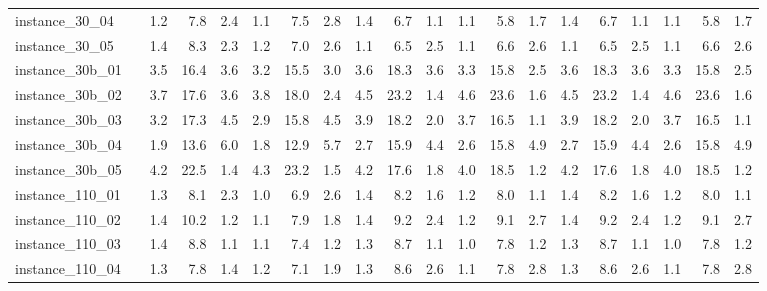 \documentclass[12pt,a4paper,openright,twoside]{book}
\begin{document}
\begin{table}[H]
{\begin{tabular}{|ll|rrrrrr|rrrrrr|rrrrrr|}
instance\_30\_04              &     &   1.2  &   7.8  &  2.4  &   1.1  &   7.5  &  2.8  &      1.4  &   6.7  &  1.1  &   1.1  &   5.8  &  1.7  &    1.4  &   6.7  &  1.1  &   1.1  &   5.8  &  1.7  \\   
instance\_30\_05              &     &   1.4  &   8.3  &  2.3  &   1.2  &   7.0  &  2.6  &      1.1  &   6.5  &  2.5  &   1.1  &   6.6  &  2.6  &    1.1  &   6.5  &  2.5  &   1.1  &   6.6  &  2.6  \\ 
instance\_30b\_01              &     &   3.5  &   16.4  &  3.6  &   3.2  &   15.5  &  3.0  &    3.6  &   18.3  &  3.6  &   3.3  &   15.8  &  2.5  &     3.6  &   18.3  &  3.6  &   3.3  &   15.8  &  2.5  \\      
instance\_30b\_02              &     &   3.7  &   17.6  &  3.6  &   3.8  &   18.0  &  2.4  &    4.5  &   23.2  &  1.4  &   4.6  &   23.6  &  1.6  &     4.5  &   23.2  &  1.4  &   4.6  &   23.6  &  1.6  \\      
instance\_30b\_03              &     &   3.2  &   17.3  &  4.5  &   2.9  &   15.8  &  4.5  &    3.9  &   18.2  &  2.0  &   3.7  &   16.5  &  1.1  &     3.9  &   18.2  &  2.0  &   3.7  &   16.5  &  1.1  \\      
instance\_30b\_04              &     &   1.9  &   13.6  &  6.0  &   1.8  &   12.9  &  5.7  &    2.7  &   15.9  &  4.4  &   2.6  &   15.8  &  4.9  &     2.7  &   15.9  &  4.4  &   2.6  &   15.8  &  4.9  \\      
instance\_30b\_05              &     &   4.2  &   22.5  &  1.4  &   4.3  &   23.2  &  1.5  &    4.2  &   17.6  &  1.8  &   4.0  &   18.5  &  1.2  &     4.2  &   17.6  &  1.8  &   4.0  &   18.5  &  1.2  \\      
instance\_110\_01             &     &    1.3  &   8.1  &  2.3  &   1.0  &   6.9  &  2.6  &     1.4  &   8.2  &  1.6  &   1.2  &   8.0  &  1.1   &     1.4  &   8.2  &  1.6  &   1.2  &   8.0  &  1.1   \\         
instance\_110\_02             &     &   1.4  &   10.2  &  1.2  &   1.1  &   7.9  &  1.8  &     1.4  &   9.2  &  2.4  &   1.2  &   9.1  &  2.7   &     1.4  &   9.2  &  2.4  &   1.2  &   9.1  &  2.7   \\         
instance\_110\_03             &     &   1.4  &   8.8  &  1.1  &   1.1  &   7.4  &  1.2  &      1.3  &   8.7  &  1.1  &   1.0  &   7.8  &  1.2   &     1.3  &   8.7  &  1.1  &   1.0  &   7.8  &  1.2   \\        
instance\_110\_04             &     &   1.3  &   7.8  &  1.4  &   1.2  &   7.1  &  1.9  &      1.3  &   8.6  &  2.6  &   1.1  &   7.8  &  2.8   &     1.3  &   8.6  &  2.6  &   1.1  &   7.8  &  2.8   \\        

\end{tabular}}
\end{table}
\end{document}
